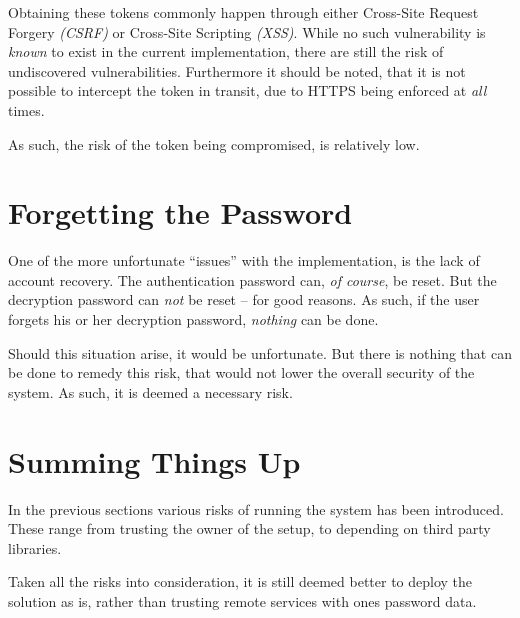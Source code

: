 		Obtaining these tokens commonly happen through either Cross-Site Request Forgery \emph{(CSRF)} or Cross-Site Scripting \emph{(XSS)}. 
		While no such vulnerability is \emph{known} to exist in the current implementation, there are still the risk of undiscovered vulnerabilities. Furthermore it should be noted, that it is not possible to intercept the token in transit, due to HTTPS being enforced at \emph{all} times.

		As such, the risk of the token being compromised, is relatively low.



	\section{Forgetting the Password}
		One of the more unfortunate ``issues'' with the implementation, is the lack of account recovery. The authentication password can, \emph{of course}, be reset. But the decryption password can \emph{not} be reset -- for good reasons. As such, if the user forgets his or her decryption password, \emph{nothing} can be done.

		Should this situation arise, it would be unfortunate. But there is nothing that can be done to remedy this risk, that would not lower the overall security of the system. As such, it is deemed a necessary risk.

	\section{Summing Things Up}
		In the previous sections various risks of running the system has been introduced. These range from trusting the owner of the setup, to depending on third party libraries.




		Taken all the risks into consideration, it is still deemed better to deploy the solution as is, rather than trusting remote services with ones password data.
